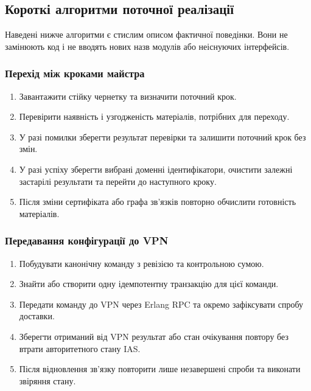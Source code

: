 \documentclass{article}
\begin{document}
\subsection{Короткі алгоритми поточної реалізації}
Наведені нижче алгоритми є стислим описом фактичної поведінки. Вони не замінюють код і не вводять нових назв модулів або неіснуючих інтерфейсів.

\subsubsection{Перехід між кроками майстра}
\begin{enumerate}
    \item Завантажити стійку чернетку та визначити поточний крок.
    \item Перевірити наявність і узгодженість матеріалів, потрібних для переходу.
    \item У разі помилки зберегти результат перевірки та залишити поточний крок без змін.
    \item У разі успіху зберегти вибрані доменні ідентифікатори, очистити залежні застарілі результати та перейти до наступного кроку.
    \item Після зміни сертифіката або графа зв'язків повторно обчислити готовність матеріалів.
\end{enumerate}

\subsubsection{Передавання конфігурації до VPN}
\begin{enumerate}
    \item Побудувати канонічну команду з ревізією та контрольною сумою.
    \item Знайти або створити одну ідемпотентну транзакцію для цієї команди.
    \item Передати команду до VPN через Erlang RPC та окремо зафіксувати спробу доставки.
    \item Зберегти отриманий від VPN результат або стан очікування повтору без втрати авторитетного стану IAS.
    \item Після відновлення зв'язку повторити лише незавершені спроби та виконати звіряння стану.
\end{enumerate}
\end{document}
